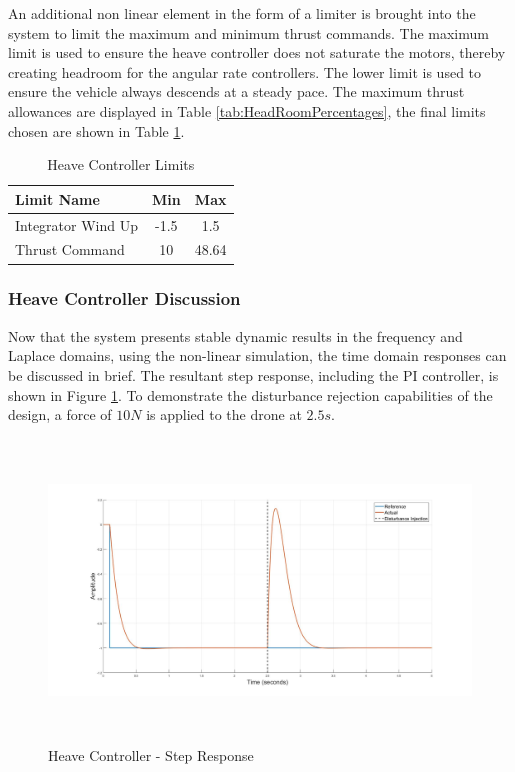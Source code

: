 \documentclass[12pt]{report}
\begin{document}
An additional non linear element in the form of a limiter is brought into the system to limit the maximum and minimum thrust commands. The maximum limit is used to ensure the heave controller does not saturate the motors, thereby creating headroom for the angular rate controllers. The lower limit is used to ensure the vehicle always descends at a steady pace. The maximum thrust allowances are displayed in Table \ref{tab:HeadRoomPercentages}, the final limits chosen are shown in Table \ref{tab:HeaveLimits}.

\begin{table}[H]
	\centering
	\begin{tabular}{l | c | c |}
		Limit Name 				& Min & Max\\
		\hline\hline
		Integrator Wind Up 	   	& -1.5 	& 1.5 \\
		Thrust Command 		    & 10	& 48.64 \\
	\end{tabular}
	\caption{Heave Controller Limits}
	\label{tab:HeaveLimits}
\end{table}

\subsubsection{Heave Controller Discussion}
Now that the system presents stable dynamic results in the frequency and Laplace domains, using the non-linear simulation, the time domain responses can be discussed in brief. The resultant step response, including the PI controller, is shown in Figure \ref{IM_HeaveStepDist}. To demonstrate the disturbance rejection capabilities of the design, a force of $10N$ is applied to the drone at $2.5s$.

\begin{figure}[H]
	\centering
	\includegraphics[height = 8cm]{../Design/Matlab/Controllers/heave_step.jpg}
	\caption{Heave Controller -  Step Response}
	\label{IM_HeaveStepDist}
\end{figure}
\end{document}
